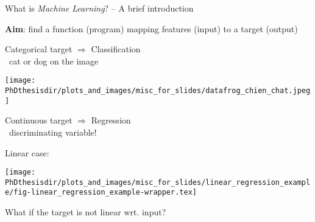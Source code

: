 \begin{frame}{What is \emph{Machine Learning}? -- A brief introduction}

\begin{center}
\textbf{Aim}: find a function (program) mapping features (input) to a target (output)
\end{center}

\pause
\begin{minipage}[t]{.45\textwidth}
\manip Categorical target $\Rightarrow$ Classification\\
\qquad\eg\ cat or dog on the image
\begin{center}
\texttt{[image: \\PhDthesisdir/plots\_and\_images/misc\_for\_slides/datafrog\_chien\_chat.jpeg]}
\end{center}


\end{minipage}
\hfill\pause
\begin{minipage}[t]{.45\textwidth}
\manip Continuous target $\Rightarrow$ Regression\\
\qquad\eg\ discriminating variable!

Linear case:
\begin{center}
\texttt{[image: \\PhDthesisdir/plots\_and\_images/misc\_for\_slides/linear\_regression\_example/fig-linear\_regression\_example-wrapper.tex]}
\end{center}

What if the target is not linear wrt. input?
\end{minipage}

\end{frame}